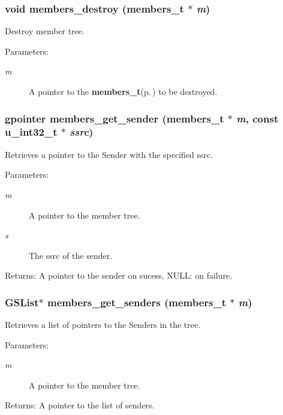 \subsubsection{\setlength{\rightskip}{0pt plus 5cm}void members\_\-destroy ({\bf members\_\-t} $\ast$ {\em m})}\label{members_8h_a1}


Destroy member tree. \begin{Desc}
\item[Parameters:]
\begin{description}
\item[{\em m}]A pointer to the {\bf members\_\-t}{\rm (p.\,\pageref{structmembers__t})} to be destroyed. \end{description}
\end{Desc}
\subsubsection{\setlength{\rightskip}{0pt plus 5cm}gpointer members\_\-get\_\-sender ({\bf members\_\-t} $\ast$ {\em m}, const u\_\-int32\_\-t $\ast$ {\em ssrc})}\label{members_8h_a9}


Retrieves a pointer to the Sender with the specified ssrc. \begin{Desc}
\item[Parameters:]
\begin{description}
\item[{\em m}]A pointer to the member tree. \item[{\em s}]The ssrc of the sender. \end{description}
\end{Desc}
\begin{Desc}
\item[Returns:]A pointer to the sender on sucess, NULL: on failure. \end{Desc}
\subsubsection{\setlength{\rightskip}{0pt plus 5cm}GSList$\ast$ members\_\-get\_\-senders ({\bf members\_\-t} $\ast$ {\em m})}\label{members_8h_a8}


Retrieves a list of pointers to the Senders in the tree. \begin{Desc}
\item[Parameters:]
\begin{description}
\item[{\em m}]A pointer to the member tree. \end{description}
\end{Desc}
\begin{Desc}
\item[Returns:]A pointer to the list of senders. \end{Desc}
